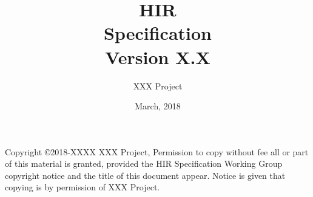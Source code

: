 \documentclass[a4paper,10pt,twoside]{article}
\title{{\Huge HIR}\\
Specification\\
\vspace{2cm}
Version X.X\\ }
\author{
\Large XXX Project\\
}
\date{\vspace{4cm}\Large March, 2018}
\begin{document}
\maketitle

Copyright \copyright 2018-XXXX  XXX Project,
Permission to copy without fee all or part of this material is granted,
provided the HIR Specification Working Group copyright notice and the
title of this document appear. Notice is given that copying is by permission
of XXX Project.

\clearpage
%
\cleardoublepage

\tableofcontents
\listoffigures
\listoftables

%

\newpage
\mbox{}\newpage

\pagestyle{fancy}
\fancyhead{} %
\fancyhead[RE]{\leftmark}
\fancyhead[LO]{\rightmark}
\fancyhead[LE,RO]{\thepage}
\fancyfoot{} %
\renewcommand{\headrulewidth}{0pt}
\renewcommand{\footrulewidth}{0pt}







\cleardoublepage
\end{document}
